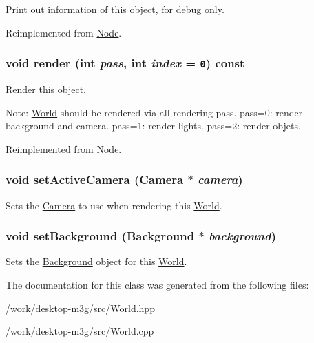 Print out information of this object, for debug only. 

Reimplemented from \hyperlink{classm3g_1_1Node_6fea17fa1532df3794f8cb39cb4f911f}{Node}.\hypertarget{classm3g_1_1World_1efcb1973989d9963d5bd6d03065d389}{
\subsubsection[{render}]{\setlength{\rightskip}{0pt plus 5cm}void render (int {\em pass}, \/  int {\em index} = {\tt 0}) const}}
\label{classm3g_1_1World_1efcb1973989d9963d5bd6d03065d389}


Render this object.

Note: \hyperlink{classm3g_1_1World}{World} should be rendered via all rendering pass. pass=0: render background and camera. pass=1: render lights. pass=2: render objets. 

Reimplemented from \hyperlink{classm3g_1_1Node_1efcb1973989d9963d5bd6d03065d389}{Node}.\hypertarget{classm3g_1_1World_dd9a82b335e8521592ad410c662a5cfd}{
\subsubsection[{setActiveCamera}]{\setlength{\rightskip}{0pt plus 5cm}void setActiveCamera ({\bf Camera} $\ast$ {\em camera})}}
\label{classm3g_1_1World_dd9a82b335e8521592ad410c662a5cfd}


Sets the \hyperlink{classm3g_1_1Camera}{Camera} to use when rendering this \hyperlink{classm3g_1_1World}{World}. \hypertarget{classm3g_1_1World_6193765c76d6dc0450f264918ebe7e1c}{
\subsubsection[{setBackground}]{\setlength{\rightskip}{0pt plus 5cm}void setBackground ({\bf Background} $\ast$ {\em background})}}
\label{classm3g_1_1World_6193765c76d6dc0450f264918ebe7e1c}


Sets the \hyperlink{classm3g_1_1Background}{Background} object for this \hyperlink{classm3g_1_1World}{World}. 

The documentation for this class was generated from the following files:\begin{CompactItemize}
\item 
/work/desktop-m3g/src/World.hpp\item 
/work/desktop-m3g/src/World.cpp\end{CompactItemize}
